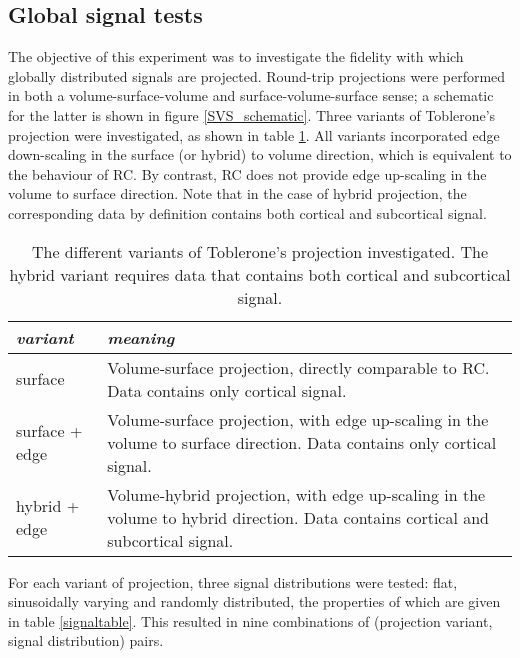 \subsection{Global signal tests}
The objective of this experiment was to investigate the fidelity with which globally distributed signals are projected. Round-trip projections were performed in both a volume-surface-volume and surface-volume-surface sense; a schematic for the latter is shown in figure \ref{SVS_schematic}. Three variants of Toblerone's projection were investigated, as shown in table \ref{projection_variants}. All variants incorporated edge down-scaling in the surface (or hybrid) to volume direction, which is equivalent to the behaviour of RC. By contrast, RC does not provide edge up-scaling in the volume to surface direction. Note that in the case of hybrid projection, the corresponding data by definition contains both cortical and subcortical signal. 

\begin{table}[H]
\centering
\def\arraystretch{1.5}
\begin{tabular}{p{3cm}|p{11cm}}
\textit{variant} & \textit{meaning}                                                                                                                                             \\ \hline
surface          & Volume-surface projection, directly comparable to RC. Data contains only cortical signal.                                                                                                         \\
surface + edge & Volume-surface projection, with edge up-scaling in the volume to surface direction. Data contains only cortical signal. 
\\
hybrid + edge  & Volume-hybrid projection, with edge up-scaling in the volume to hybrid direction. Data contains cortical and subcortical signal.                                                                                \end{tabular}
\caption{The different variants of Toblerone's projection investigated. The hybrid variant requires data that contains both cortical and subcortical signal.}
\label{projection_variants}
\end{table}

For each variant of projection, three signal distributions were tested: flat, sinusoidally varying and randomly distributed, the properties of which are given in table \ref{signaltable}. This resulted in nine combinations of (projection variant, signal distribution) pairs. 

